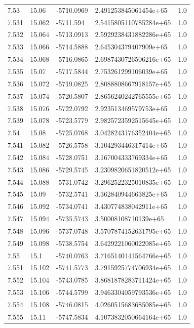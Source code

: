 \begin{tabular}{lllll}
7.53 & 15.06 & -5710.0969 & 2.491253845061454e+65 & 1.0 \\
7.531 & 15.062 & -5711.594 & 2.5415805110785284e+65 & 1.0 \\
7.532 & 15.064 & -5713.0913 & 2.5929238431882286e+65 & 1.0 \\
7.533 & 15.066 & -5714.5888 & 2.645304379407909e+65 & 1.0 \\
7.534 & 15.068 & -5716.0865 & 2.6987430726506216e+65 & 1.0 \\
7.535 & 15.07 & -5717.5844 & 2.753261299106039e+65 & 1.0 \\
7.536 & 15.072 & -5719.0825 & 2.8088808667918157e+65 & 1.0 \\
7.537 & 15.074 & -5720.5807 & 2.8656240242765555e+65 & 1.0 \\
7.538 & 15.076 & -5722.0792 & 2.923513469579753e+65 & 1.0 \\
7.539 & 15.078 & -5723.5779 & 2.9825723592515645e+65 & 1.0 \\
7.54 & 15.08 & -5725.0768 & 3.0428243176352404e+65 & 1.0 \\
7.541 & 15.082 & -5726.5758 & 3.104293446317414e+65 & 1.0 \\
7.542 & 15.084 & -5728.0751 & 3.167004333769334e+65 & 1.0 \\
7.543 & 15.086 & -5729.5745 & 3.2309820651820512e+65 & 1.0 \\
7.544 & 15.088 & -5731.0742 & 3.2962522325010835e+65 & 1.0 \\
7.545 & 15.09 & -5732.5741 & 3.362840944663825e+65 & 1.0 \\
7.546 & 15.092 & -5734.0741 & 3.430774838042911e+65 & 1.0 \\
7.547 & 15.094 & -5735.5743 & 3.50008108710139e+65 & 1.0 \\
7.548 & 15.096 & -5737.0748 & 3.5707874152631795e+65 & 1.0 \\
7.549 & 15.098 & -5738.5754 & 3.6429221060022085e+65 & 1.0 \\
7.55 & 15.1 & -5740.0763 & 3.7165140141564766e+65 & 1.0 \\
7.551 & 15.102 & -5741.5773 & 3.7915925774706934e+65 & 1.0 \\
7.552 & 15.104 & -5743.0785 & 3.8681878283711424e+65 & 1.0 \\
7.553 & 15.106 & -5744.5799 & 3.9463304059793536e+65 & 1.0 \\
7.554 & 15.108 & -5746.0815 & 4.0260515683685085e+65 & 1.0 \\
7.555 & 15.11 & -5747.5834 & 4.1073832050664164e+65 & 1.0 \\

\end{tabular}
